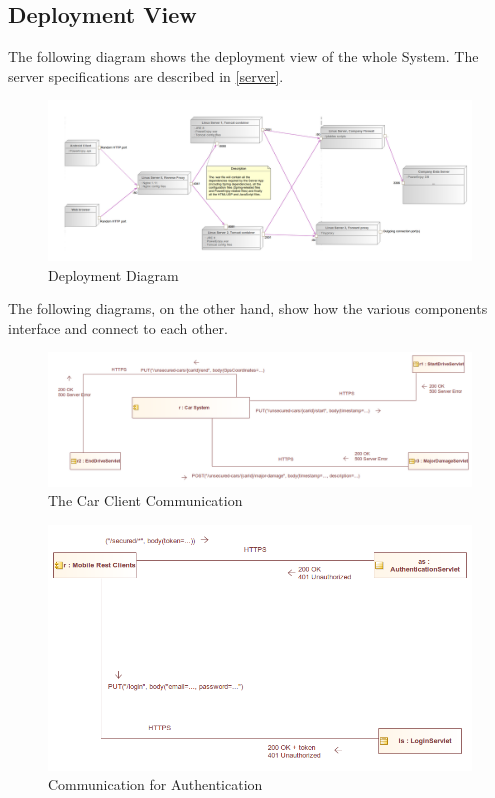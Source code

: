 \documentclass[12pt]{article}
\begin{document}
\subsection{Deployment View}
The following diagram shows the deployment view of the whole System. The server specifications are described in \ref{server}.
\begin{figure}[h]
	\centering
	\includegraphics[width=\textwidth]{../Images/Deployment}
	\caption{Deployment Diagram}
\end{figure}

The following diagrams, on the other hand, show how the various components interface and connect to each other.

\begin{figure}[h]
	\centering
	\includegraphics[width=\textwidth]{../Images/CarClient_Communication}
	\caption{The Car Client Communication}
\end{figure}

\begin{figure}[h]
	\centering
	\includegraphics[width=\textwidth]{../Images/MobileAuth_Communication}
	\caption{Communication for Authentication}
\end{figure}
\end{document}
